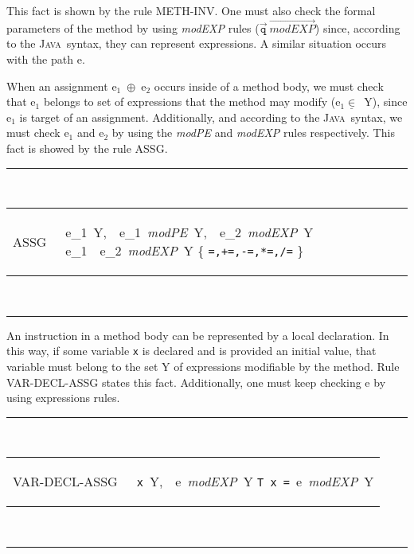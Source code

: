 \documentclass[a4paper]{llncs}
\newcommand{\java}{\textsc{Java}}
\begin{document}
This fact is shown by the rule
\textup{METH-INV}.  One must also check the formal parameters
of the method by using \emph{modEXP} rules
($\overrightarrow{\texttt{q}}\ \overrightarrow{\textit{modEXP}}$) since,
according to the \java~syntax, they can represent expressions. A similar
situation occurs with the path \textup{e}.

When an assignment \textup{e}$_1$\ $\oplus$\
\textup{e}$_2$ occurs inside of a method body, we must check that
\textup{e}$_1$ belongs to set of expressions that the method may modify
(\textup{e}$_1\underline{\in}$\ \textsc{Y}), since \textup{e}$_1$ is
target of an assignment. Additionally, and according to the
\java~syntax, we must check \textup{e}$_1$ and \textup{e}$_2$ by
using the \textit{modPE} and \textit{modEXP} rules respectively. This
fact is showed by the rule \textup{ASSG}.
\begin{table}[hbt] %
\rule{\linewidth}{0.25mm}
\\[0.5ex]
\begin{tabular}{ll}
ASSG\,\,\, & 
\begin{prooftree}
\textup{e}_1\underline{\in}\ \textsc{Y},\ \ \textup{e}_1\
\textit{modPE}\ \textsc{Y},\ \ \textup{e}_2\ \textit{modEXP}\
\textsc{Y}
\justifies
\textup{e}_1\ \oplus\ \textup{e}_2\ \textit{modEXP}\ \textsc{Y}
\using
\oplus \in \{ \texttt{=,+=,-=,*=,/=} \}
\end{prooftree}
\end{tabular}
\\[0.5ex]
\rule{\linewidth}{0.25mm}
\end{table} %

An instruction in a method body can be represented by a local
declaration. In this way, if some variable \texttt{x} is declared and is
provided an initial value, that variable must belong to the
set \textsc{Y} of expressions modifiable by the method. Rule
\textup{VAR-DECL-ASSG} states this fact. Additionally, one must
keep checking \textup{e} by using expressions rules.
\begin{table}[hbt] %
\rule{\linewidth}{0.25mm}
\\[0.5ex]
\begin{tabular}{ll}
VAR-DECL-ASSG\,\,\, & 
\begin{prooftree}
\rule[1ex]{0em}{1.5ex}
\texttt{x}\underline{\in}\ \textsc{Y},\ \ \textup{e}\ \textit{modEXP}\ \textsc{Y}
\justifies
\texttt{T x =}\ \textup{e}\ \textit{modEXP}\ \textsc{Y}
\end{prooftree}
\end{tabular}
\\[0.5ex]
\rule{\linewidth}{0.25mm}
\end{table} %
\end{document}
